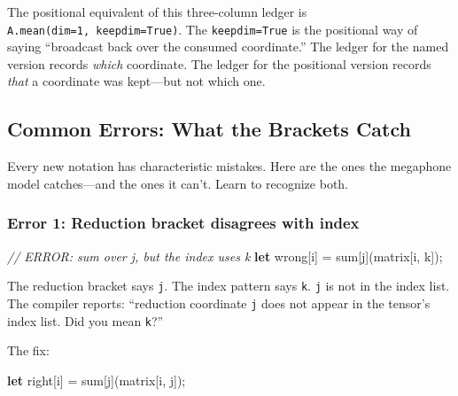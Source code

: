 \documentclass[11pt,titlepage]{article}
\newenvironment{Shaded}{}{}
\newcommand{\CommentTok}[1]{\textcolor[rgb]{0.38,0.63,0.69}{\textit{#1}}}
\newcommand{\KeywordTok}[1]{\textcolor[rgb]{0.00,0.44,0.13}{\textbf{#1}}}
\newcommand{\NormalTok}[1]{#1}
\newcommand{\OperatorTok}[1]{\textcolor[rgb]{0.40,0.40,0.40}{#1}}
\begin{document}
The positional equivalent of this three-column ledger is
\texttt{A.mean(dim=1,\ keepdim=True)}. The \texttt{keepdim=True} is the
positional way of saying ``broadcast back over the consumed
coordinate.'' The ledger for the named version records \emph{which}
coordinate. The ledger for the positional version records \emph{that} a
coordinate was kept---but not which one.

\vspace{2em}

\hypertarget{common-errors-what-the-brackets-catch}{%
\subsection{Common Errors: What the Brackets
Catch}\label{common-errors-what-the-brackets-catch}}

Every new notation has characteristic mistakes. Here are the ones the
megaphone model catches---and the ones it can't. Learn to recognize
both.

\hypertarget{error-1-reduction-bracket-disagrees-with-index}{%
\subsubsection{Error 1: Reduction bracket disagrees with
index}\label{error-1-reduction-bracket-disagrees-with-index}}

\begin{Shaded}
\begin{Highlighting}[]
\CommentTok{// ERROR: sum over j, but the index uses k}
\KeywordTok{let}\NormalTok{ wrong}\OperatorTok{[}\NormalTok{i}\OperatorTok{]}\NormalTok{ = sum}\OperatorTok{[}\NormalTok{j}\OperatorTok{]}\NormalTok{(matrix}\OperatorTok{[}\NormalTok{i, k}\OperatorTok{]}\NormalTok{);}
\end{Highlighting}
\end{Shaded}

The reduction bracket says \texttt{j}. The index pattern says
\texttt{k}. \texttt{j} is not in the index list. The compiler reports:
``reduction coordinate \texttt{j} does not appear in the tensor's index
list. Did you mean \texttt{k}?''

The fix:

\begin{Shaded}
\begin{Highlighting}[]
\KeywordTok{let}\NormalTok{ right}\OperatorTok{[}\NormalTok{i}\OperatorTok{]}\NormalTok{ = sum}\OperatorTok{[}\NormalTok{j}\OperatorTok{]}\NormalTok{(matrix}\OperatorTok{[}\NormalTok{i, j}\OperatorTok{]}\NormalTok{);}
\end{Highlighting}
\end{Shaded}
\end{document}
